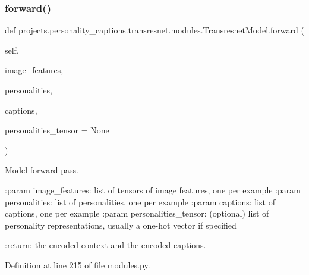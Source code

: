 \subsubsection{\texorpdfstring{forward()}{forward()}}
{\footnotesize\ttfamily def projects.\+personality\+\_\+captions.\+transresnet.\+modules.\+Transresnet\+Model.\+forward (\begin{DoxyParamCaption}\item[{}]{self,  }\item[{}]{image\+\_\+features,  }\item[{}]{personalities,  }\item[{}]{captions,  }\item[{}]{personalities\+\_\+tensor = {\ttfamily None} }\end{DoxyParamCaption})}

\begin{DoxyVerb}Model forward pass.

:param image_features:
    list of tensors of image features, one per example
:param personalities:
    list of personalities, one per example
:param captions:
    list of captions, one per example
:param personalities_tensor:
    (optional) list of personality representations, usually a one-hot
    vector if specified

:return:
    the encoded context and the encoded captions.
\end{DoxyVerb}
 

Definition at line 215 of file modules.\+py.


